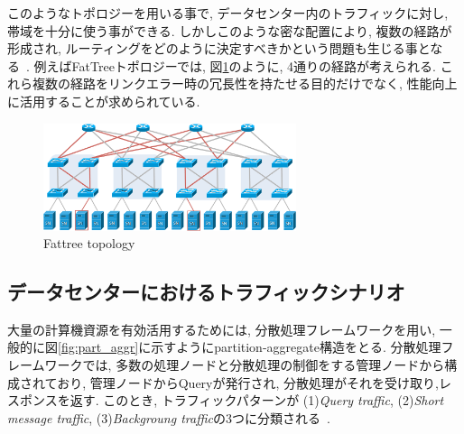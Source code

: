 \documentclass[10pt, a4paper, twocolumn]{jsarticle}
\begin{document}
このようなトポロジーを用いる事で, データセンター内のトラフィックに対し, 帯域を十分に使う事ができる.
しかしこのような密な配置により, 複数の経路が形成され, ルーティングをどのように決定すべきかという問題も生じる事となる~\cite{improving}.
例えばFatTreeトポロジーでは, 図\ref{fig:fattree}のように, 4通りの経路が考えられる.
これら複数の経路をリンクエラー時の冗長性を持たせる目的だけでなく, 性能向上に活用することが求められている.
\begin{figure}[h]
    \begin{center}
    \includegraphics[autoebb, width=210pt]{./img/fattree_topology.pdf}
    \caption{Fattree topology}
    \label{fig:fattree}
    \end{center}
\end{figure}


\subsection{データセンターにおけるトラフィックシナリオ}
\label{sec:traffic_scenario}
大量の計算機資源を有効活用するためには,
分散処理フレームワークを用い, 一般的に図\ref{fig:part_aggr}に示すようにpartition-aggregate構造をとる.
分散処理フレームワークでは, 多数の処理ノードと分散処理の制御をする管理ノードから構成されており, 管理ノードからQueryが発行され, 分散処理がそれを受け取り,レスポンスを返す.
このとき, トラフィックパターンが  (1){\it Query traffic}, (2){\it Short message
traffic}, (3){\it Backgroung traffic}の3つに分類される~\cite{dctcp}.
\end{document}
